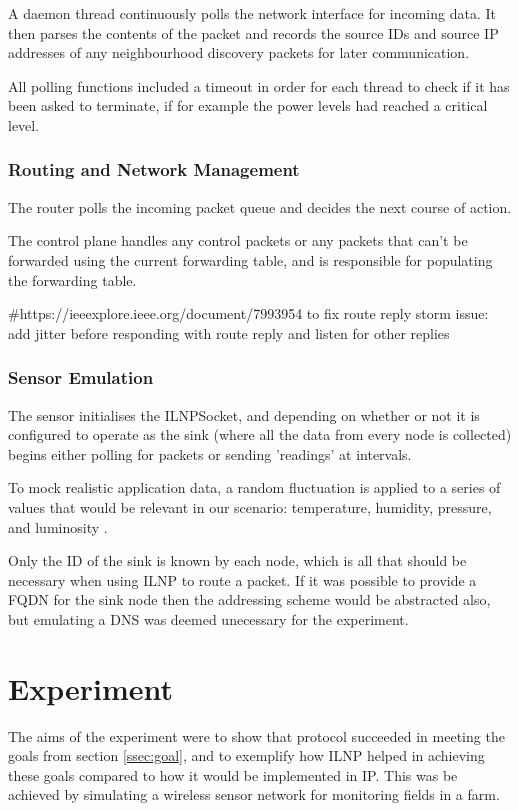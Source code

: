 \documentclass[12pt]{article}
\begin{document}
A daemon thread continuously polls the network interface for incoming data. It then parses the contents of the packet and records the source IDs and source IP addresses of any neighbourhood discovery packets for later communication. 

All polling functions included a timeout in order for each thread to check if it has been asked to terminate, if for example the power levels had reached a critical level.

\section{Routing and Network Management}

The router polls the incoming packet queue and decides the next course of action. 

The control plane handles any control packets or any packets that can't be forwarded using the current forwarding table, and is responsible for populating the forwarding table.

\#https://ieeexplore.ieee.org/document/7993954 to fix route reply storm issue: add jitter before responding with route reply and listen for other replies

\section{Sensor Emulation}

The sensor initialises the ILNPSocket, and depending on whether or not it is configured to operate as the sink (where all the data from every node is collected) begins either polling for packets or sending 'readings' at intervals.

To mock realistic application data, a random fluctuation is applied to a series of values that would be relevant in our scenario: temperature, humidity, pressure, and luminosity \cite{agrisensor}.

Only the ID of the sink is known by each node, which is all that should be necessary when using ILNP to route a packet. If it was possible to provide a FQDN for the sink node then the addressing scheme would be abstracted also, but emulating a DNS was deemed unecessary for the experiment.

\pagebreak
\part{Experiment}

The aims of the experiment were to show that protocol succeeded in meeting the goals from section \ref{ssec:goal}, and to exemplify how ILNP helped in achieving these goals compared to how it would be implemented in IP. This was be achieved by simulating a wireless sensor network for monitoring fields in a farm. 
\end{document}

